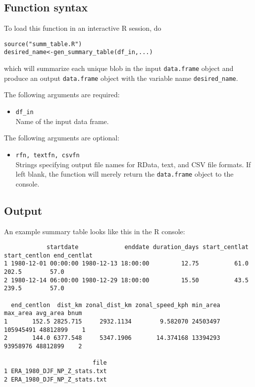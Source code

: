 \documentclass{article}
\begin{document}
\subsection{Function syntax}
To load this function in an interactive R session, do
\begin{verbatim}
source("summ_table.R")
desired_name<-gen_summary_table(df_in,...)
\end{verbatim}

which will summarize each unique blob in the input \texttt{data.frame} object and produce an output \texttt{data.frame} object with the variable name \texttt{desired\_name}.

The following arguments are required:
\begin{itemize}
\item[] \texttt{df\_in}\\ Name of the input data frame.
\end{itemize}

The following arguments are optional:
\begin{itemize}
\item[] \texttt{rfn, textfn, csvfn}\\Strings specifying output file names for RData, text, and CSV file formats. If left blank, the function will merely return the \texttt{data.frame} object to the console.
\end{itemize}

\subsection{Output}
An example summary table looks like this in the R console:
\begin{verbatim}
            startdate             enddate duration_days start_centlat start_centlon end_centlat
1 1980-12-01 00:00:00 1980-12-13 18:00:00         12.75          61.0         202.5        57.0
2 1980-12-14 06:00:00 1980-12-29 18:00:00         15.50          43.5         239.5        57.0

  end_centlon  dist_km zonal_dist_km zonal_speed_kph min_area  max_area avg_area bnum
1       152.5 2825.715     2932.1134        9.582070 24503497 105945491 48812899    1
2       144.0 6377.548     5347.1906       14.374168 13394293  93958976 48812899    2

                         file
1 ERA_1980_DJF_NP_Z_stats.txt
2 ERA_1980_DJF_NP_Z_stats.txt
\end{verbatim}
\end{document}
